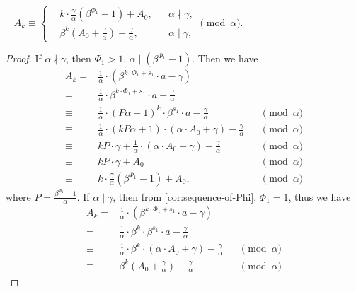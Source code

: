 \begin{corollary}~\label{cor:modulo-alpha-of-layers}
   $A_k \equiv\left\{\begin{aligned}
        &k\cdot\frac{\gamma}{\alpha}(\beta^{\Phi_1} - 1) + A_0, &&\alpha \nmid \gamma,\\
        &\beta^{k}\left(A_0 + \frac{\gamma}{\alpha}\right) - \frac{\gamma}{\alpha}, &&\alpha \mid \gamma,
   \end{aligned}\right. \pmod{\alpha}$.
\end{corollary}
\begin{proof}
    If $\alpha \nmid \gamma$, then $\Phi_1 > 1$, $\alpha \mid (\beta^{\Phi_1} - 1)$. Then we have
    \begin{align*}
        A_{k} =& \frac{1}{\alpha}\cdot (\beta^{k\cdot \Phi_1 + s_1}\cdot a - \gamma)  &&\ \\
        =& \frac{1}{\alpha}\cdot \beta^{k\cdot \Phi_1 + s_1}\cdot a - \frac{\gamma}{\alpha}   &&\ \\
        \equiv& \frac{1}{\alpha}\cdot (P\alpha + 1)^{k}\cdot\beta^{s_1}\cdot a - \frac{\gamma}{\alpha}   &&\pmod{\alpha}\\
        \equiv& \frac{1}{\alpha}\cdot (kP\alpha + 1)\cdot (\alpha\cdot A_0 + \gamma) - \frac{\gamma}{\alpha}   &&\pmod{\alpha}\\
        \equiv& kP\cdot\gamma + \frac{1}{\alpha}\cdot(\alpha\cdot A_0 + \gamma) - \frac{\gamma}{\alpha}   &&\pmod{\alpha}\\
        \equiv& kP\cdot\gamma + A_0 &&\pmod{\alpha} \\
        \equiv& k\cdot\frac{\gamma}{\alpha}(\beta^{\Phi_1} - 1) + A_0, &&\pmod{\alpha}
    \end{align*}
    where $P = \frac{\beta^{\Phi_1} - 1}{\alpha}$.\newline
    If $\alpha \mid \gamma$, then from \cref{cor:sequence-of-Phi}, $\Phi_1 = 1$, thus we have
    \begin{align*}
        A_{k} =& \frac{1}{\alpha}\cdot (\beta^{k\cdot \Phi_1 + s_1}\cdot a - \gamma)  &&\ \\
        =& \frac{1}{\alpha}\cdot \beta^{k}\cdot \beta^{s_1}\cdot a - \frac{\gamma}{\alpha}   &&\ \\
        \equiv& \frac{1}{\alpha}\cdot \beta^{k}\cdot (\alpha\cdot A_0 + \gamma) - \frac{\gamma}{\alpha}   &&\pmod{\alpha}\\
        \equiv& \beta^{k}\left(A_0 + \frac{\gamma}{\alpha}\right) - \frac{\gamma}{\alpha}.   &&\pmod{\alpha}
    \end{align*}
\end{proof}

